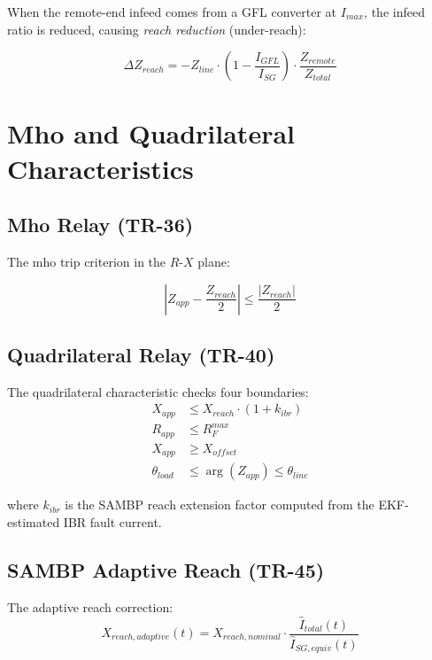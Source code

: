 \documentclass[11pt,a4paper]{report}
\begin{document}
When the remote-end infeed comes from a GFL converter at $I_{max}$, the infeed ratio is reduced, causing \emph{reach reduction} (under-reach):

\begin{equation}
\Delta Z_{reach} = -Z_{line}\cdot\left(1 - \frac{I_{GFL}}{I_{SG}}\right)\cdot\frac{Z_{remote}}{Z_{total}}
\end{equation}

\section{Mho and Quadrilateral Characteristics}

\subsection{Mho Relay (TR-36)}

The mho trip criterion in the $R$-$X$ plane:

\begin{equation}
\label{eq:mho}
\left|Z_{app} - \frac{Z_{reach}}{2}\right| \leq \frac{|Z_{reach}|}{2}
\end{equation}

\subsection{Quadrilateral Relay (TR-40)}

The quadrilateral characteristic checks four boundaries:
\begin{align}
X_{app} &\leq X_{reach} \cdot(1 + k_{ibr}) \label{eq:quad_x}\\
R_{app} &\leq R_F^{max} \label{eq:quad_r}\\
X_{app} &\geq X_{offset} \label{eq:quad_xlo}\\
\theta_{load} &\leq \arg(Z_{app}) \leq \theta_{line} \label{eq:quad_angle}
\end{align}

where $k_{ibr}$ is the SAMBP reach extension factor computed from the EKF-estimated IBR fault current.

\subsection{SAMBP Adaptive Reach (TR-45)}

The adaptive reach correction:
\begin{equation}
\label{eq:adaptive_reach}
X_{reach,adaptive}(t) = X_{reach,nominal}\cdot\frac{\hat{I}_{total}(t)}{\hat{I}_{SG,equiv}(t)}
\end{equation}
\end{document}
